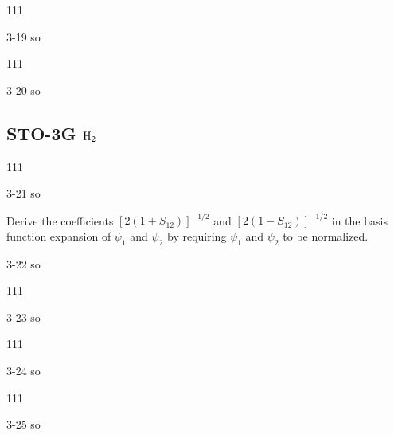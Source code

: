 \documentclass[a4paper]{book}
\begin{document}
	\begin{exercise}
	111
	\end{exercise}
	
	\begin{solution}
		3-19 so
	\end{solution}
	
	\begin{exercise}
	111
	\end{exercise}
	
	\begin{solution}
		3-20 so
	\end{solution}
	
	\subsection{STO-3G \texorpdfstring{$\ce{H2}$}-}
	
	\begin{exercise}
	111
	\end{exercise}
	
	\begin{solution}
		3-21 so
	\end{solution}
	
	\begin{exercise}
	Derive the coefficients $[2(1+S_{12})]^{-1/2}$ and $[2(1-S_{12})]^{-1/2}$ in the basis function expansion of $\psi_1$ and $\psi_2$ by requiring $\psi_1$ and $\psi_2$ to be normalized.
	\end{exercise}
	
	\begin{solution}
		3-22 so
	\end{solution}

	\begin{exercise}
	111
	\end{exercise}
	
	\begin{solution}
		3-23 so
	\end{solution}

	\begin{exercise}
	111
	\end{exercise}
	
	\begin{solution}
		3-24 so
	\end{solution}
	
	\begin{exercise}
	111
	\end{exercise}
	
	\begin{solution}
		3-25 so
	\end{solution}
	
\end{document}
